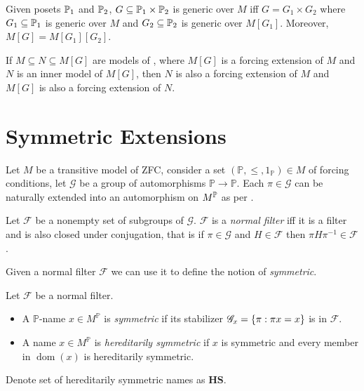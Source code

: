 \begin{lemma}
    \label{lemma:iterated_forcing_product}
    Given posets \(\P_1\) and \(\P_2\),
    \(G\subseteq \P_1\times\P_2\) is generic over \(M\) iff
    \(G = G_1\times G_2\) where \(G_1\subseteq \P_1\) is generic over \(M\) and \(G_2\subseteq \P_2\) is generic over \(M[G_1]\).
    Moreover, \(M[G] = M[G_1][G_2]\).
\end{lemma}

\begin{theorem}
    \label{proposition:intermediate_model_property}
    If \(M\subseteq N\subseteq M[G]\) are models of \ZFC,
    where \(M[G]\) is a forcing extension of \(M\) and \(N\) is an inner model of \(M[G]\),
    then \(N\) is also a forcing extension of \(M\) and
    \(M[G]\) is also a forcing extension of \(N\).
\end{theorem}


\section{Symmetric Extensions}


\renewcommand*{\G}{\mathscr{G}}
\newcommand*{\dom}{\operatorname{dom}}
Let \(M\) be a transitive model of ZFC, consider a set \((\mathbb{P}, \leq, 1_{\mathbb{P}}) \in M\) of forcing conditions,
let \(\G\) be a group of automorphisms \(\mathbb{P} \to \mathbb{P}\).
Each \(\pi\in \G\) can be naturally extended into an automorphism on \(M^\P\) as per .

\begin{definition}
    Let \(\mathscr{F}\) be a nonempty set of subgroups of \(\G\).
    \(\mathscr{F}\) is a \emph{normal filter} iff it is a filter and is also closed under conjugation, that is
    if \(\pi\in \G\) and \(H\in\mathscr{F}\) then \(\pi H \pi^{-1} \in\mathscr{F}\).
\end{definition}
Given a normal filter \(\mathscr{F}\) we can use it to define the notion of \emph{symmetric}.
\begin{definition}
    Let \(\mathscr{F}\) be a normal filter.
    \begin{itemize}
        \item A \(\mathbb{P}\)-name \(x\in M^{\mathbb{P}}\) is \emph{symmetric} if its stabilizer \(\G_x = \set{\pi: \pi x = x}\) is in \(\mathscr{F}\).
        \item A name \(x\in M^{\mathbb{P}}\) is \emph{hereditarily symmetric} if \(x\) is symmetric and every member in \(\dom(x)\) is hereditarily symmetric.
    \end{itemize}
    Denote set of hereditarily symmetric names as \(\mathbf{HS}\).
\end{definition}


